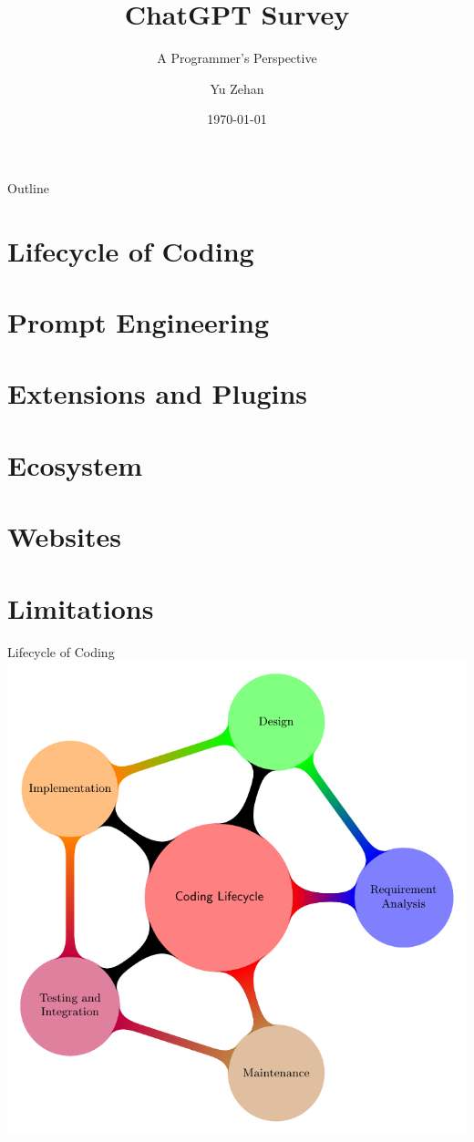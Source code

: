 \documentclass{beamer}
\title{ChatGPT Survey}
\subtitle{A Programmer's Perspective}
\author{Yu Zehan}
\institute{Intel FLEX}
\date{\today}
\begin{document}
\begin{frame}
  \titlepage
\end{frame}

\begin{frame}{Outline}
  \tableofcontents
\end{frame}

\section{Lifecycle of Coding}
\section{Prompt Engineering}
\section{Extensions and Plugins}
\section{Ecosystem}
\section{Websites}
\section{Limitations}

\begin{frame}{Lifecycle of Coding}
  \includegraphics[width=\textwidth,height=0.8\textheight,keepaspectratio]{tikz-code-lifecycle.pdf}
\end{frame}
\end{document}
